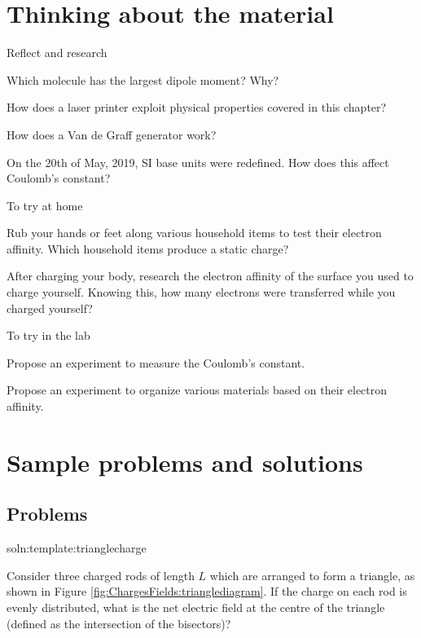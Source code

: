 \newpage
\section{Thinking about the material}

\begin{chapteractivity}{Reflect and research}
{
\item Which molecule has the largest dipole moment? Why?
\item How does a laser printer exploit physical properties covered in this chapter?
\item How does a Van de Graff generator work?
\item On the 20th of May, 2019, SI base units were redefined. How does this affect Coulomb's constant?
}
\end{chapteractivity}

\begin{chapteractivity}{To try at home}
{
\item Rub your hands or feet along various household items to test their electron affinity. Which household items produce a static charge?
\item After charging your body, research the electron affinity of the surface you used to charge yourself. Knowing this, how many electrons were transferred while you charged yourself?
}
\end{chapteractivity}

\begin{chapteractivity}{To try in the lab}
{
\item Propose an experiment to measure the Coulomb's constant.
\item Propose an experiment to organize various materials based on their electron affinity.
}
\end{chapteractivity}

\newpage
\section{Sample problems and solutions}





\subsection{Problems}
\begin{problem}{soln:template:trianglecharge}{\label{prob:template:trianglecharge} 
Consider three charged rods of length $L$ which are arranged to form a triangle, as shown in Figure \ref{fig:ChargesFields:trianglediagram}. If the charge on each rod is evenly distributed, what is the net electric field at the centre of the triangle (defined as the intersection of the bisectors)?

}
\end{problem}

